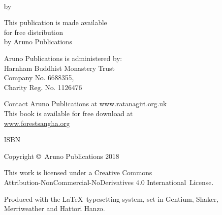 \cleartoverso
\thispagestyle{empty}

{\copyrightsize
\raggedright
\setlength{\parindent}{0pt}%
\setlength{\parskip}{0.8\baselineskip}%

\thetitle\\
by \theauthor

This publication is made available\\
for free distribution\\
by Aruno Publications

Aruno Publications is administered by:\\
Harnham Buddhist Monastery Trust\\
Company No. 6688355,\\
Charity Reg. No. 1126476

Contact Aruno Publications at \href{https://ratanagiri.org.uk/}{www.ratanagiri.org.uk}\\
This book is available for free download at\\
\href{https://forestsangha.org/}{www.forestsangha.org}

ISBN \theISBN

Copyright \copyright\ Aruno Publications 2018

\vfill

{\footnotesize

This work is licensed under a Creative Commons\\
Attribution-NonCommercial-NoDerivatives 4.0 International~License.

Produced with the \LaTeX\ typesetting system, set in Gentium, Shaker,\\
Merriweather and Hattori Hanzo.

\theEditionInfo

}}
